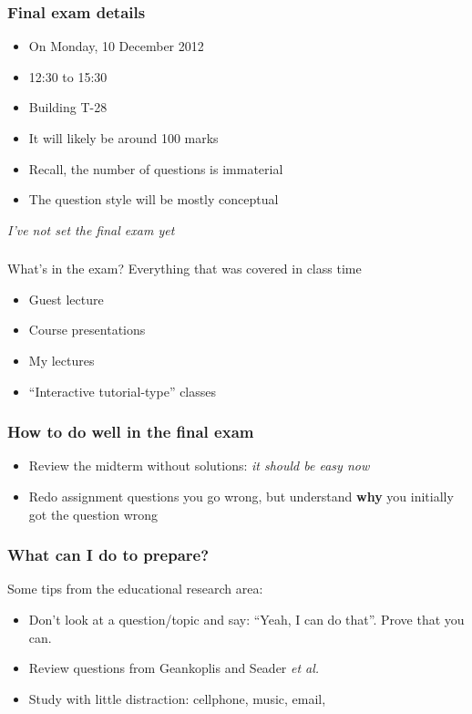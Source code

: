
\begin{frame}\frametitle{Final exam details}
	\begin{itemize}
		\item	On Monday, 10 December 2012
		\item	12:30 to 15:30
		\item	Building T-28
		\item	It will likely be around 100 marks
		\item	Recall, the number of questions is immaterial
		\item	The question style will be mostly conceptual
	\end{itemize}
	\vspace{24pt}
	\emph{I've not set the final exam yet}
\end{frame}

\begin{frame}\frametitle{}
	\begin{exampleblock}{What's in the exam?}
		Everything that was covered in class time
	\end{exampleblock}
	\vspace{24pt}
	\begin{itemize}
		\item	Guest lecture
		\item	Course presentations
		\item	My lectures
		\item	``Interactive tutorial-type'' classes
	\end{itemize}
	
\end{frame}

\begin{frame}\frametitle{How to do well in the final exam}
	\begin{itemize}
		\item	Review the midterm without solutions: \emph{it should be easy now}
		\item	Redo assignment questions you go wrong, but understand \textbf{why} you initially got the question wrong
	\end{itemize}
\end{frame}

\begin{frame}\frametitle{What can I do to prepare?}
	Some tips from the educational research area:
	\begin{itemize}
		\item	Don't look at a question/topic and say: ``Yeah, I can do that''. Prove that you can.
		\item	Review questions from Geankoplis and Seader \emph{et al.}
		\item	Study with little distraction: cellphone, music, email, 
	\end{itemize}
\end{frame}

